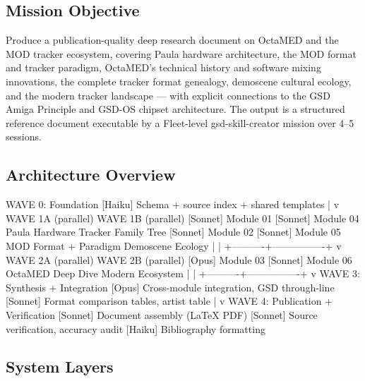 \documentclass[11pt,letterpaper]{article}
\begin{document}
\subsection{Mission Objective}

Produce a publication-quality deep research document on OctaMED and the MOD tracker ecosystem, covering Paula hardware architecture, the MOD format and tracker paradigm, OctaMED's technical history and software mixing innovations, the complete tracker format genealogy, demoscene cultural ecology, and the modern tracker landscape --- with explicit connections to the GSD Amiga Principle and GSD-OS chipset architecture. The output is a structured reference document executable by a Fleet-level gsd-skill-creator mission over 4--5 sessions.

\subsection{Architecture Overview}

\begin{asciibox}
WAVE 0: Foundation
  [Haiku] Schema + source index + shared templates
       |
       v
WAVE 1A (parallel)          WAVE 1B (parallel)
[Sonnet] Module 01           [Sonnet] Module 04
  Paula Hardware              Tracker Family Tree
[Sonnet] Module 02           [Sonnet] Module 05
  MOD Format + Paradigm       Demoscene Ecology
       |                           |
       +----------+----------------+
                  v
WAVE 2A (parallel)          WAVE 2B (parallel)
[Opus]  Module 03           [Sonnet] Module 06
  OctaMED Deep Dive           Modern Ecosystem
       |                           |
       +----------+----------------+
                  v
WAVE 3: Synthesis + Integration
  [Opus] Cross-module integration, GSD through-line
  [Sonnet] Format comparison tables, artist table
       |
       v
WAVE 4: Publication + Verification
  [Sonnet] Document assembly (LaTeX PDF)
  [Sonnet] Source verification, accuracy audit
  [Haiku] Bibliography formatting
\end{asciibox}

\subsection{System Layers}
\end{document}
